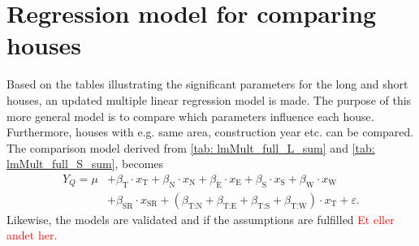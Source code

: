\section{Regression model for comparing houses}
Based on the tables illustrating the significant parameters for the long and short houses, an updated multiple linear regression model is made. The purpose of this more general model is to compare which parameters influence each house. Furthermore, houses with e.g. same area, construction year etc. can be compared. The comparison model derived from \cref{tab: lmMult_full_L_sum} and \cref{tab: lmMult_full_S_sum}, becomes
\begin{align}
        Y_{Q} = \mu & + \beta_{\text{T}}\cdot x_{\text{T}} + \beta_{\text{N}}\cdot x_{\text{N}} + \beta_{\text{E}}\cdot x_{\text{E}}+ \beta_{\text{S}}\cdot x_{\text{S}} + \beta_{\text{W}}\cdot x_{\text{W}} \nonumber \\ & + \beta_{\text{SR}}\cdot x_{\text{SR}} + (\beta_{\text{T:N}} + \beta_{\text{T:E}} + \beta_{\text{T:S}} + \beta_{\text{T:W}}) \cdot x_{\text{T}} + \varepsilon. \label{eq: general_lm}
\end{align}
Likewise, the models are validated and if the assumptions are fulfilled \textcolor{red}{Et eller andet her.}

